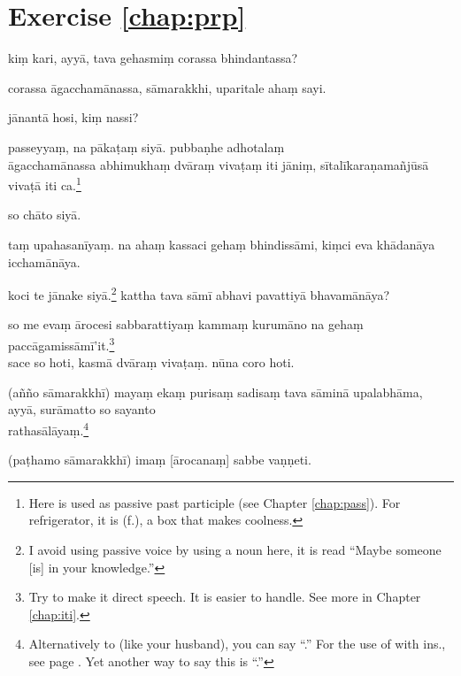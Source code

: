 \section*{Exercise \ref{chap:prp}}
\begin{answerkey}
\item ki\d m kari, ayy\=a, tava gehasmi\d m corassa bhindantassa?
\item corassa \=agaccham\=anassa, s\=amarakkhi, uparitale aha\d m sayi.
\item j\=anant\=a hosi, ki\d m nassi?
\item passeyya\d m, na p\=aka\d ta\d m siy\=a. pubba\d nhe adhotala\d m \\\=agaccham\=anassa abhimukha\d m dv\=ara\d m viva\d ta\d m iti j\=ani\d m, s\=ital\=ikara\d nama\~nj\=us\=a viva\d t\=a iti ca.\footnote{Here  is used as passive past participle (see Chapter \ref{chap:pass}). For refrigerator, it is  (f.), a box that makes coolness.}
\item so ch\=ato siy\=a.
\item ta\d m upahasan\=iya\d m. na aha\d m kassaci geha\d m bhindiss\=ami, ki\d mci eva kh\=adan\=aya iccham\=an\=aya.
\item koci te j\=anake siy\=a.\footnote{I avoid using passive voice by using a noun here, it is read ``Maybe someone [is] in your knowledge.''} kattha tava s\=am\=i abhavi pavattiy\=a bhavam\=an\=aya?
\item so me eva\d m \=arocesi sabbarattiya\d m kamma\d m kurum\=ano na geha\d m pacc\=agamiss\=am\=i'it.\footnote{Try to make it direct speech. It is easier to handle. See more in Chapter \ref{chap:iti}.} \\sace so hoti, kasm\=a dv\=ara\d m viva\d ta\d m. n\=una coro hoti.
\item (a\~n\~no s\=amarakkh\=i) maya\d m eka\d m purisa\d m sadisa\d m tava s\=amin\=a upalabh\=ama, ayy\=a, sur\=amatto so sayanto \\rathas\=al\=aya\d m.\footnote{Alternatively to  (like your husband), you can say ``.'' For the use of  with ins., see page \pageref{nip:samadm}. Yet another way to say this is ``.''}
\item (pa\d thamo s\=amarakkh\=i) ima\d m [\=arocana\d m] sabbe va\d n\d neti.
\end{answerkey}

